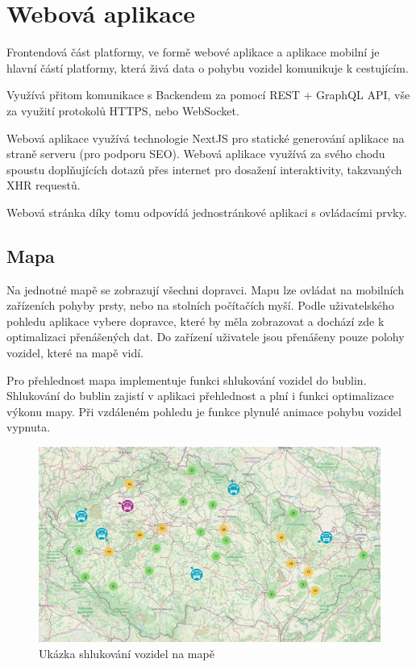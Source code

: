 \section{Webová aplikace}

Frontendová část platformy, ve formě webové aplikace a aplikace mobilní je hlavní částí platformy, která živá data o pohybu vozidel komunikuje k cestujícím.

Využívá přitom komunikace s Backendem za pomocí REST + GraphQL API, vše za využití protokolů HTTPS, nebo WebSocket.

Webová aplikace využívá technologie NextJS pro statické generování aplikace na straně serveru (pro podporu SEO).
Webová aplikace využívá za svého chodu spoustu doplňujících dotazů přes internet pro dosažení interaktivity, takzvaných XHR requestů.

Webová stránka díky tomu odpovídá jednostránkové aplikaci s ovládacími prvky.

\subsection{Mapa}
Na jednotné mapě se zobrazují všechni dopravci.
Mapu lze ovládat na mobilních zařízeních pohyby prsty, nebo na stolních počítačích myší. Podle uživatelského pohledu aplikace vybere dopravce, které by měla zobrazovat a dochází zde k optimalizaci přenášených dat. Do zařízení uživatele jsou přenášeny pouze polohy vozidel, které na mapě vidí.

Pro přehlednost mapa implementuje funkci shlukování vozidel do bublin. Shlukování do bublin zajistí v aplikaci přehlednost a plní i funkci optimalizace výkonu mapy.
Při vzdáleném pohledu je funkce plynulé animace pohybu vozidel vypnuta.
\begin{figure}[H]
    \centering
    \includegraphics[width=1\textwidth]{images/global_map.png}
    \caption{Ukázka shlukování vozidel na mapě}
    \label{shlukovani}
\end{figure}

